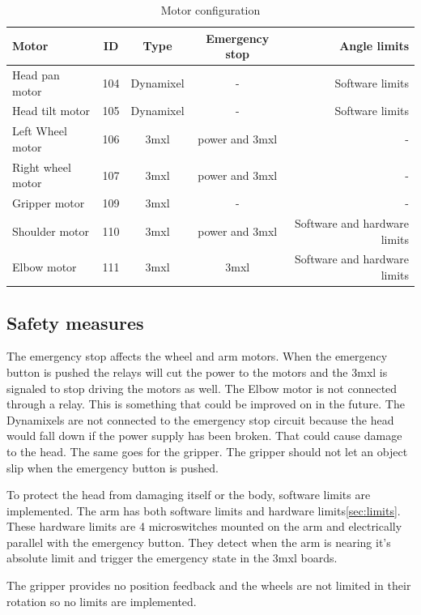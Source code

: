 \documentclass[technical_document.tex]{subfiles}
\begin{document}
\begin{table}[h]
\centering
  \begin{tabular}{| l | c | c | c | r |}
    \hline
    {\bf Motor} & {\bf ID} & {\bf Type} & {\bf Emergency stop} & {\bf Angle limits}	\\ \hline
    Head pan motor 	& 	104 & 	Dynamixel & -	& Software limits	\\ \hline
    Head tilt motor 	&	105 &	Dynamixel & -	& Software limits		\\ \hline
    Left Wheel motor   &	106 & 	3mxl &		power and 3mxl	& -	\\ \hline
    Right wheel motor &	107 & 	3mxl &		power and 3mxl	& -	\\ \hline
    Gripper motor	 & 	109 &	3mxl &		-	& -	\\ \hline
    Shoulder motor 	 &	110 &	3mxl &		power and 3mxl	& Software and hardware limits \\ \hline
    Elbow motor 		 &	111 &	3mxl &		3mxl	& Software and hardware limits	\\ 
    \hline
  \end{tabular}
\caption{Motor configuration}
\label{tab:motorConfiguration}
\end{table}



\newpage
\subsection{Safety measures}
The emergency stop affects the wheel and arm motors. When the emergency button is pushed the relays will cut the power to the motors and the 3mxl is signaled to stop driving the motors as well. The Elbow motor is not connected through a relay. This is something that could be improved on in the future.
The Dynamixels are not connected to the emergency stop circuit because the head would fall down if the power supply has been broken. That could cause damage to the head. The same goes for the gripper. The gripper should not let an object slip when the emergency button is pushed.

To protect the head from damaging itself or the body, software limits are implemented. The arm has both software limits and hardware limits\ref{sec:limits}. These hardware limits are 4 microswitches mounted on the arm and electrically parallel with the emergency button. They detect when the arm is nearing it's absolute limit and trigger the emergency state in the 3mxl boards.

The gripper provides no position feedback and the wheels are not limited in their rotation so no limits are implemented.
\end{document}
